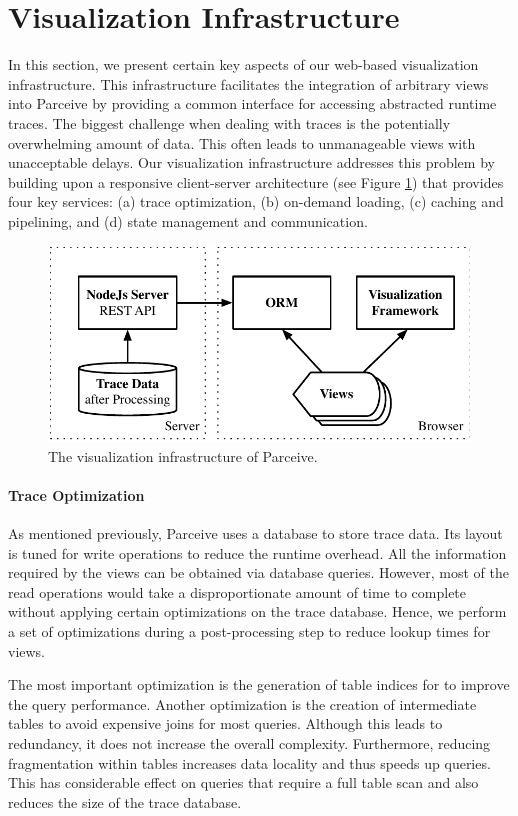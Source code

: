 \section{Visualization Infrastructure}
In this section, we present certain key aspects of our web-based visualization
infrastructure. This infrastructure facilitates the integration of arbitrary
views into Parceive by providing a common interface for accessing abstracted
runtime traces. The biggest challenge when dealing with traces is the
potentially overwhelming amount of data. This often leads to unmanageable views
with unacceptable delays. Our visualization infrastructure addresses this
problem by building upon a responsive client-server architecture (see Figure
\ref{fig:visualization}) that provides four key services: (a) trace
optimization, (b) on-demand loading, (c) caching and pipelining, and (d)
state management and communication.

\begin{figure}[h!]
\includegraphics[width=\linewidth]{img/visualization_framework}
\caption{The visualization infrastructure of Parceive.}
\label{fig:visualization}
\end{figure}

\paragraph{Trace Optimization}
As mentioned previously, Parceive uses a database to store trace data. Its
layout is tuned for write operations to reduce the runtime overhead. All the
information required by the views can be obtained via database queries.
However, most of the read operations would take a disproportionate amount of
time to complete without applying certain optimizations on the trace database.
Hence, we perform a set of optimizations during a post-processing step to
reduce lookup times for views.

The most important optimization is the generation of table indices for
to improve the query performance. Another optimization is the creation of
intermediate tables to avoid expensive joins for most queries. Although this
leads to redundancy, it does not increase the overall complexity.
Furthermore, reducing fragmentation within tables increases data locality and
thus speeds up queries. This has considerable effect on queries that require a
full table scan and also reduces the size of the trace database.

